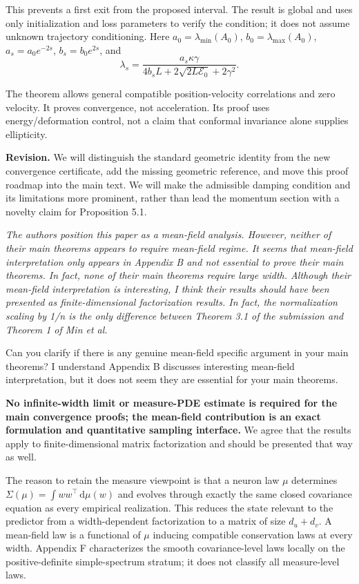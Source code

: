 \documentclass[11pt,a4paper]{article}
\renewenvironment{quote}
  {\par\addvspace{0.8em}\Needspace{8\baselineskip}%
    \list{}{\leftmargin=1.2em\rightmargin=0pt\topsep=0.25em
    \parsep=0.3em}\item\relax\normalsize\itshape\color{quotegray}}
  {\endlist\nopagebreak[4]}
\begin{document}
This prevents a first exit from the proposed interval. The result is global and uses only initialization and loss parameters to verify the condition; it does not assume unknown trajectory conditioning. Here \(a_0=\lambda_{\min}(A_0)\), \(b_0=\lambda_{\max}(A_0)\), \(a_s=a_0e^{-2s}\), \(b_s=b_0e^{2s}\), and
\[
\lambda_s=\frac{a_s\kappa\gamma}{4b_sL+2\sqrt{2L\mathcal E_0}+2\gamma^2}.
\]

The theorem allows general compatible position-velocity correlations and zero velocity. It proves convergence, not acceleration. Its proof uses energy/deformation control, not a claim that conformal invariance alone supplies ellipticity.

\textbf{Revision.} We will distinguish the standard geometric identity from the new convergence certificate, add the missing geometric reference, and move this proof roadmap into the main text. We will make the admissible damping condition and its limitations more prominent, rather than lead the momentum section with a novelty claim for Proposition 5.1.

\begin{quote}
The authors position this paper as a mean-field analysis. However, neither of their main theorems appears to require mean-field regime. It seems that mean-field interpretation only appears in Appendix B and not essential to prove their main theorems. In fact, none of their main theorems require large width. Although their mean-field interpretation is interesting, I think their results should have been presented as finite-dimensional factorization results. In fact, the normalization scaling by 1/n is the only difference between Theorem 3.1 of the submission and Theorem 1 of Min et al.

Can you clarify if there is any genuine mean-field specific argument in your main theorems? I understand Appendix B discusses interesting mean-field interpretation, but it does not seem they are essential for your main theorems.
\end{quote}

\textbf{No infinite-width limit or measure-PDE estimate is required for the main convergence proofs; the mean-field contribution is an exact formulation and quantitative sampling interface.} We agree that the results apply to finite-dimensional matrix factorization and should be presented that way as well.

The reason to retain the measure viewpoint is that a neuron law \(\mu\) determines \(\Sigma(\mu)=\int ww^\top\,\mathrm d\mu(w)\) and evolves through exactly the same closed covariance equation as every empirical realization. This reduces the state relevant to the predictor from a width-dependent factorization to a matrix of size \(d_u+d_v\). A mean-field law is a functional of \(\mu\) inducing compatible conservation laws at every width. Appendix F characterizes the smooth covariance-level laws locally on the positive-definite simple-spectrum stratum; it does not classify all measure-level laws.
\end{document}
